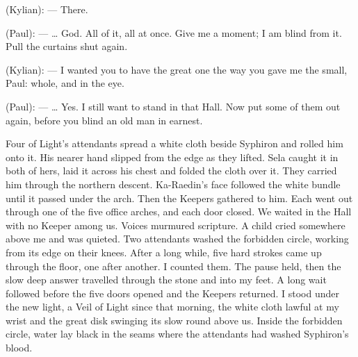 \ornament

\begin{room}

(Kylian): --- There.

(Paul): --- \ldots{} God. All of it, all at once. Give me a moment; I am blind from it. Pull the curtains shut again.

(Kylian): --- I wanted you to have the great one the way you gave me the small, Paul: whole, and in the eye.

(Paul): --- \ldots{} Yes. I still want to stand in that Hall. Now put some of them out again, before you blind an old man in earnest.

\end{room}

Four of Light's attendants spread a white cloth beside Syphiron and rolled him onto it. His nearer hand slipped from the edge as they lifted. Sela caught it in both of hers, laid it across his chest and folded the cloth over it. They carried him through the northern descent. Ka-Raedin's face followed the white bundle until it passed under the arch. Then the Keepers gathered to him. Each went out through one of the five office arches, and each door closed. We waited in the Hall with no Keeper among us. Voices murmured scripture. A child cried somewhere above me and was quieted. Two attendants washed the forbidden circle, working from its edge on their knees. After a long while, five hard strokes came up through the floor, one after another. I counted them. The pause held, then the slow deep answer travelled through the stone and into my feet. A long wait followed before the five doors opened and the Keepers returned. I stood under the new light, a Veil of Light since that morning, the white cloth lawful at my wrist and the great disk swinging its slow round above us. Inside the forbidden circle, water lay black in the seams where the attendants had washed Syphiron's blood.\par

\ornament
